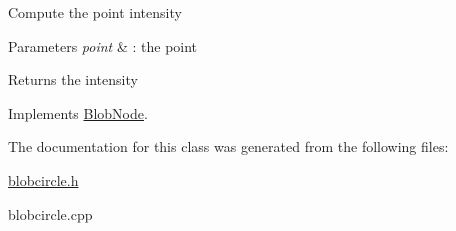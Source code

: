 Compute the point intensity


\begin{DoxyParams}{Parameters}
{\em point} & : the point \\
\hline
\end{DoxyParams}
\begin{DoxyReturn}{Returns}
the intensity 
\end{DoxyReturn}


Implements \hyperlink{class_blob_node_a4987f9060e9141647c514efd9859d0ba}{BlobNode}.



The documentation for this class was generated from the following files:\begin{DoxyCompactItemize}
\item 
\hyperlink{blobcircle_8h}{blobcircle.h}\item 
blobcircle.cpp\end{DoxyCompactItemize}
